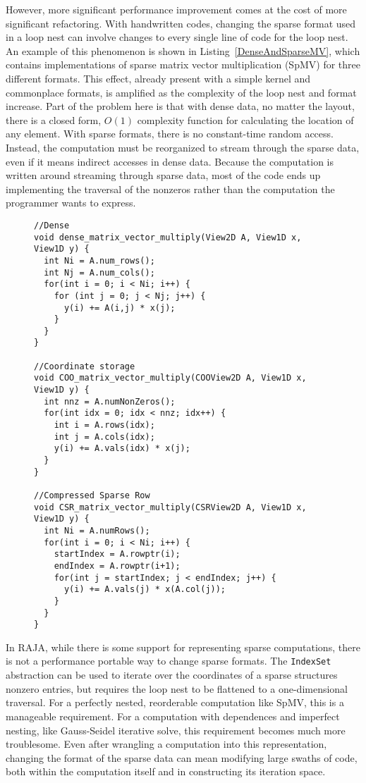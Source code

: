 However, more significant performance improvement comes at the cost of more significant refactoring.
With handwritten codes, changing the sparse format used in a loop nest can involve changes to every single line of code for the loop nest.
An example of this phenomenon is shown in Listing~\ref{DenseAndSparseMV}, which contains implementations of sparse matrix vector multiplication (SpMV) for three different formats.
This effect, already present with a simple kernel and commonplace formats, is amplified as the complexity of the loop nest and format increase.
Part of the problem here is that with dense data, no matter the layout, there is a closed form, $O(1)$ complexity function for calculating the location of any element.
With sparse formats, there is no constant-time random access.
Instead, the computation must be reorganized to stream through the sparse data, even if it means indirect accesses in dense data.
Because the computation is written around streaming through sparse data, most of the code ends up implementing the traversal of the nonzeros rather than the computation the programmer wants to express.

\begin{figure}
\begin{lstlisting}[caption={Matrix vector multiply routines for matrices in different formats.},label=DenseAndSparseMV]  
//Dense
void dense_matrix_vector_multiply(View2D A, View1D x, View1D y) {
  int Ni = A.num_rows();
  int Nj = A.num_cols();
  for(int i = 0; i < Ni; i++) {
    for (int j = 0; j < Nj; j++) {
      y(i) += A(i,j) * x(j);
    }
  }
}

//Coordinate storage
void COO_matrix_vector_multiply(COOView2D A, View1D x, View1D y) {
  int nnz = A.numNonZeros();
  for(int idx = 0; idx < nnz; idx++) {
    int i = A.rows(idx);
    int j = A.cols(idx);
    y(i) += A.vals(idx) * x(j);
  }
}

//Compressed Sparse Row
void CSR_matrix_vector_multiply(CSRView2D A, View1D x, View1D y) {
  int Ni = A.numRows();
  for(int i = 0; i < Ni; i++) {
    startIndex = A.rowptr(i);
    endIndex = A.rowptr(i+1);
    for(int j = startIndex; j < endIndex; j++) {
      y(i) += A.vals(j) * x(A.col(j));
    }
  }
}
\end{lstlisting}
\end{figure}

  
In RAJA, while there is some support for representing sparse computations, there is not a performance portable way to change sparse formats.
The \verb.IndexSet. abstraction can be used to iterate over the coordinates of a sparse structures nonzero entries, but requires the loop nest to be flattened to a one-dimensional traversal.
For a perfectly nested, reorderable computation like SpMV, this is a manageable requirement.
For a computation with dependences and imperfect nesting, like Gauss-Seidel iterative solve, this requirement becomes much more troublesome.
Even after wrangling a computation into this representation, changing the format of the sparse data can mean modifying large swaths of code, both within the computation itself and in constructing its iteration space.


